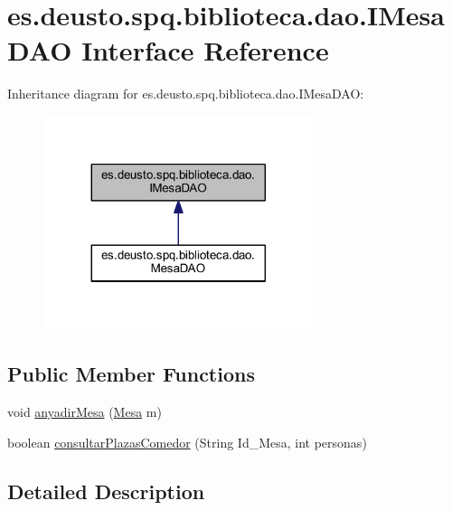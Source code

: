 \hypertarget{interfacees_1_1deusto_1_1spq_1_1biblioteca_1_1dao_1_1_i_mesa_d_a_o}{}\section{es.\+deusto.\+spq.\+biblioteca.\+dao.\+I\+Mesa\+D\+AO Interface Reference}
\label{interfacees_1_1deusto_1_1spq_1_1biblioteca_1_1dao_1_1_i_mesa_d_a_o}


Inheritance diagram for es.\+deusto.\+spq.\+biblioteca.\+dao.\+I\+Mesa\+D\+AO\+:
\nopagebreak
\begin{figure}[H]
\begin{center}
\leavevmode
\includegraphics[width=224pt]{interfacees_1_1deusto_1_1spq_1_1biblioteca_1_1dao_1_1_i_mesa_d_a_o__inherit__graph}
\end{center}
\end{figure}
\subsection*{Public Member Functions}
\begin{DoxyCompactItemize}
\item 
void \mbox{\hyperlink{interfacees_1_1deusto_1_1spq_1_1biblioteca_1_1dao_1_1_i_mesa_d_a_o_ac50be7c69b793e067aceb17f3b01594a}{anyadir\+Mesa}} (\mbox{\hyperlink{classes_1_1deusto_1_1spq_1_1biblioteca_1_1data_1_1_mesa}{Mesa}} m)
\item 
boolean \mbox{\hyperlink{interfacees_1_1deusto_1_1spq_1_1biblioteca_1_1dao_1_1_i_mesa_d_a_o_a82ff152d68c25134fdffa41a1b08a347}{consultar\+Plazas\+Comedor}} (String Id\+\_\+\+Mesa, int personas)
\end{DoxyCompactItemize}


\subsection{Detailed Description}


